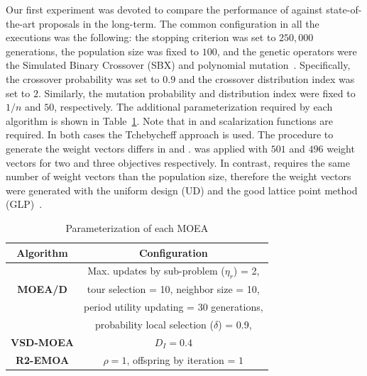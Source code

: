 Our first experiment was devoted to compare the performance of \VSDMOEA{} against state-of-the-art proposals in the long-term.
%
The common configuration in all the executions was the following: the stopping criterion was set to $250,000$ generations, 
the population size was fixed to $100$, and the genetic operators were the Simulated Binary Crossover (SBX) and polynomial 
mutation~\cite{Joel:SBX1994, Joel:Mutation}.
%
Specifically, the crossover probability was set to $0.9$ and the crossover distribution index was
set to $2$.
%
Similarly, the mutation probability and distribution index were fixed to $1/n$ and $50$, respectively.
%
The additional parameterization required by each algorithm is shown in Table~\ref{tab:Parametrization}.
%
Note that in \MOEAD{} and \RMOEA{} scalarization functions are required.
%
In both cases the Tchebycheff approach is used.
%
The procedure to generate the weight vectors differs in \MOEAD{} and \RMOEA{}.
%
\RMOEA{} was applied with $501$ and $496$ weight vectors for two and three objectives respectively.
%
In contrast, \MOEAD{} requires the same number of weight vectors than the population size, therefore the weight vectors were generated with the uniform design (UD) and the good lattice point method (GLP)~\cite{Joel:MOEAD_Uniform_Design, Joel:Kuhn_Munkres}.



%
\begin{table}[t]
\centering
\caption{Parameterization of each MOEA}
\label{tab:Parametrization}
\begin{tabular}{c|c}
\hline
\textbf{Algorithm} & \textbf{Configuration} \\ \hline
\multirow{3}{*}{\textbf{MOEA/D}} &Max. updates by sub-problem ($\eta_r$) = 2, \\
 & tour selection = 10,   neighbor size = 10, \\
 & period utility updating = 30 generations, \\ 
 & probability local selection ($\delta$) = 0.9,\\ \hline
\textbf{VSD-MOEA} & $D_I=0.4$ \\ \hline
\textbf{R2-EMOA} & $\rho=1$, offspring by iteration = $1$ \\ \hline
\end{tabular}
\end{table}



